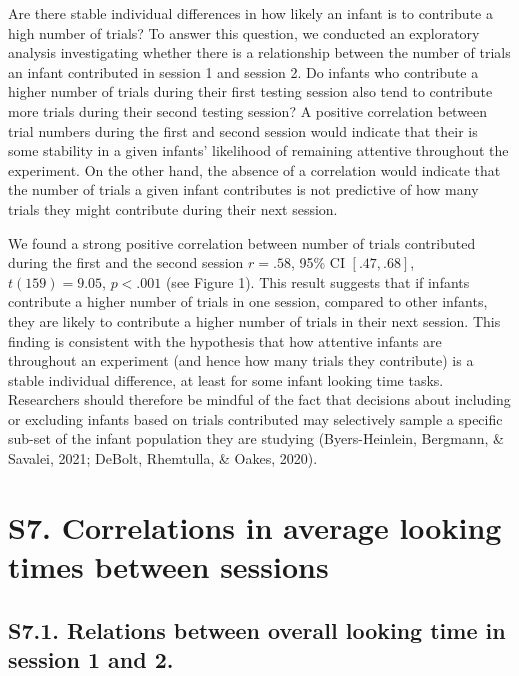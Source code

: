 \documentclass[
  man, donotrepeattitle,floatsintext]{apa6}
\begin{document}
Are there stable individual differences in how likely an infant is to contribute a high number of trials?
To answer this question, we conducted an exploratory analysis investigating whether there is a relationship between the number of trials an infant contributed in session 1 and session 2.
Do infants who contribute a higher number of trials during their first testing session also tend to contribute more trials during their second testing session?
A positive correlation between trial numbers during the first and second session would indicate that their is some stability in a given infants' likelihood of remaining attentive throughout the experiment.
On the other hand, the absence of a correlation would indicate that the number of trials a given infant contributes is not predictive of how many trials they might contribute during their next session.

We found a strong positive correlation between number of trials contributed during the first and the second session \(r = .58\), 95\% CI \([.47, .68]\), \(t(159) = 9.05\), \(p < .001\) (see Figure 1).
This result suggests that if infants contribute a higher number of trials in one session, compared to other infants, they are likely to contribute a higher number of trials in their next session.
This finding is consistent with the hypothesis that how attentive infants are throughout an experiment (and hence how many trials they contribute) is a stable individual difference, at least for some infant looking time tasks.
Researchers should therefore be mindful of the fact that decisions about including or excluding infants based on trials contributed may selectively sample a specific sub-set of the infant population they are studying (Byers-Heinlein, Bergmann, \& Savalei, 2021; DeBolt, Rhemtulla, \& Oakes, 2020).

\hypertarget{s7.-correlations-in-average-looking-times-between-sessions}{%
\section{S7. Correlations in average looking times between sessions}\label{s7.-correlations-in-average-looking-times-between-sessions}}

\hypertarget{s7.1.-relations-between-overall-looking-time-in-session-1-and-2.}{%
\subsection{S7.1. Relations between overall looking time in session 1 and 2.}\label{s7.1.-relations-between-overall-looking-time-in-session-1-and-2.}}
\end{document}
